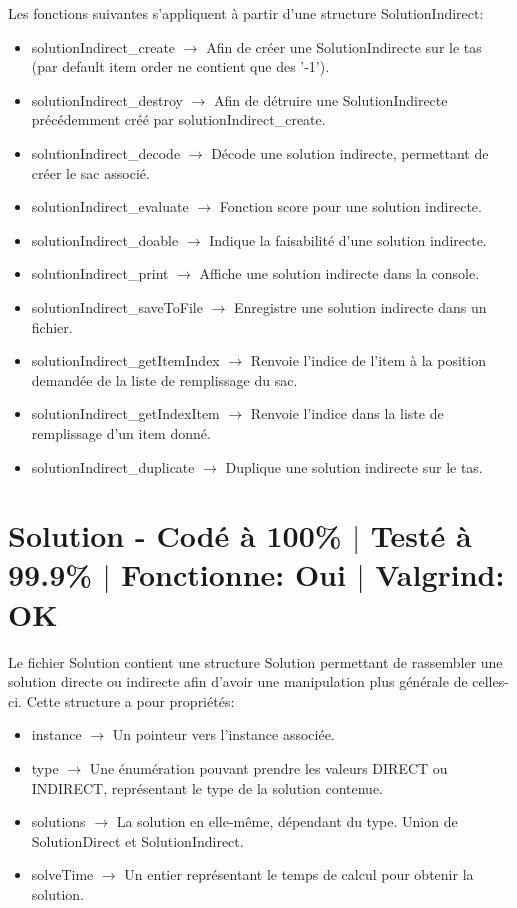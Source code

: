 \documentclass{EPUProjetPeiP}
\newcommand{\comp}[5]{
	\section[#1]{#1 {\small - Codé à #2\% $\vert$ Testé à #3\% $\vert$ Fonctionne: #4 $\vert$ Valgrind: #5}}
}
\begin{document}
Les fonctions suivantes s'appliquent à partir d'une structure SolutionIndirect:
\begin{itemize}
	\item solutionIndirect\_create $\longrightarrow$ Afin de créer une SolutionIndirecte sur le tas (par default item order ne contient que des '-1').
	\item solutionIndirect\_destroy $\longrightarrow$ Afin de détruire une SolutionIndirecte précédemment créé par solutionIndirect\_create.
	\item solutionIndirect\_decode $\longrightarrow$ Décode une solution indirecte, permettant de créer le sac associé.
	\item solutionIndirect\_evaluate $\longrightarrow$ Fonction score pour une solution indirecte.
	\item solutionIndirect\_doable $\longrightarrow$ Indique la faisabilité d'une solution indirecte.
	\item solutionIndirect\_print $\longrightarrow$ Affiche une solution indirecte dans la console.
	\item solutionIndirect\_saveToFile $\longrightarrow$ Enregistre une solution indirecte dans un fichier.
	\item solutionIndirect\_getItemIndex $\longrightarrow$ Renvoie l'indice de l'item à la position demandée de la liste de remplissage du sac.
	\item solutionIndirect\_getIndexItem $\longrightarrow$ Renvoie l'indice dans la liste de remplissage d'un item donné.
	\item solutionIndirect\_duplicate $\longrightarrow$ Duplique une solution indirecte sur le tas.
\end{itemize}

\comp{Solution}{100}{99.9}{Oui}{OK}
Le fichier Solution contient une structure Solution permettant de rassembler une solution directe ou indirecte afin d'avoir une manipulation plus générale de celles-ci. Cette structure a pour propriétés:
\begin{itemize}
	\item instance $\longrightarrow$ Un pointeur vers l'instance associée.
	\item type $\longrightarrow$ Une énumération pouvant prendre les valeurs DIRECT ou INDIRECT, représentant le type de la solution contenue.
	\item solutions $\longrightarrow$ La solution en elle-même, dépendant du type. Union de SolutionDirect et SolutionIndirect.
	\item solveTime $\longrightarrow$ Un entier représentant le temps de calcul pour obtenir la solution.\\
\end{itemize}
\end{document}
